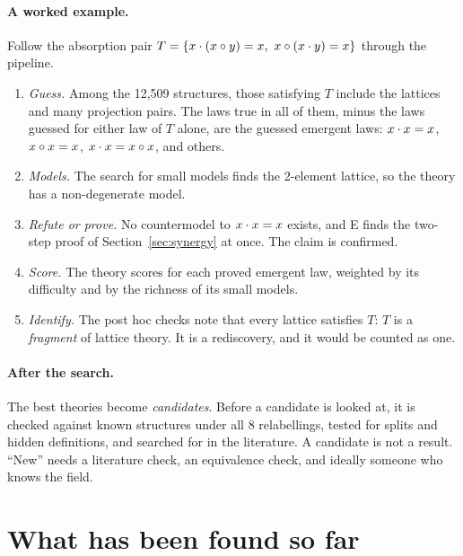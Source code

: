 \documentclass[11pt,a4paper]{article}
\begin{document}
\paragraph{A worked example.} Follow the absorption pair $T=\{x\cdot(x\circ y)=x,\ x\circ(x\cdot y)=x\}$ through the
pipeline.
\begin{enumerate}
\item \emph{Guess.} Among the 12,509 structures, those satisfying $T$ include the lattices and many projection
  pairs. The laws true in all of them, minus the laws guessed for either law of $T$ alone, are the guessed emergent
  laws: $x\cdot x=x$, $x\circ x=x$, $x\cdot x=x\circ x$, and others.
\item \emph{Models.} The search for small models finds the 2-element lattice, so
  the theory has a non-degenerate model.
\item \emph{Refute or prove.} No countermodel to $x\cdot x=x$ exists, and E finds the two-step proof of
  Section~\ref{sec:synergy} at once. The claim is confirmed.
\item \emph{Score.} The theory scores for each proved emergent law, weighted by its difficulty and by the richness of
  its small models.
\item \emph{Identify.} The post hoc checks note that every lattice satisfies $T$: $T$ is a \emph{fragment} of lattice
  theory. It is a rediscovery, and it would be counted as one.
\end{enumerate}

\paragraph{After the search.} The best theories become \emph{candidates}. Before a candidate is looked at, it is
checked against known structures under all 8 relabellings, tested for splits and hidden definitions, and searched
for in the literature. A candidate is not a result. ``New'' needs a literature check, an equivalence check, and
ideally someone who knows the field.


\section{What has been found so far}\label{sec:found}
\end{document}

